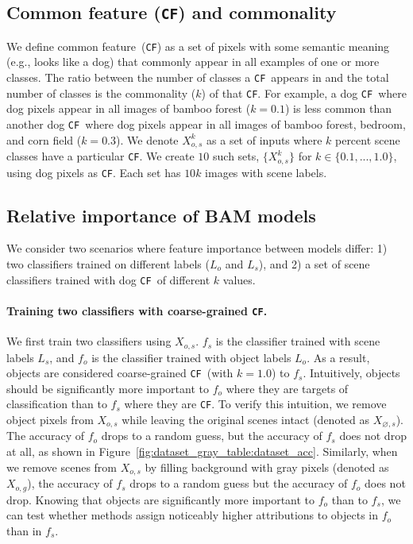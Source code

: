 \documentclass[twoside]{article}
\newcommand{\commonF}{common feature}
\newcommand{\CF}{\texttt{CF}}
\begin{document}
\subsection{Common feature (\CF) and commonality}
We define \commonF~(\CF) as a set of pixels with some semantic meaning (e.g., looks like a dog) that commonly appear in all examples of one or more classes. The ratio between the number of classes a \CF~appears in and the total number of classes is the commonality ($k$) of that \CF. For example, a dog \CF~where dog pixels appear in all images of bamboo forest ($k=0.1$) is less common than another dog \CF~where dog pixels appear in all images of bamboo forest, bedroom, and corn field ($k=0.3$). We denote $X_{o,s}^k$ as a set of inputs where $k$ percent scene classes have a particular \CF. We create $10$ such sets, $\{X_{o, s}^k\}$ for $k \in \{0.1, ..., 1.0\}$, using dog pixels as \CF. Each set has $10k$ images with scene labels.

\subsection{Relative importance of BAM models}
\label{sec:relative_feature_importance_models}
We consider two scenarios where feature importance between models differ: 1) two classifiers trained on different labels ($L_o$ and $L_s$), and 2) a set of scene classifiers trained with dog \CF~of different $k$ values.

\paragraph{Training two classifiers with coarse-grained \CF.}
We first train two classifiers using $X_{o,s}$. $f_s$ is the classifier trained with scene labels $L_s$, and $f_o$ is the classifier trained with object labels $L_o$. As a result, objects are considered coarse-grained \CF~(with $k=1.0$) to $f_s$. Intuitively, objects should be significantly more important to $f_o$ where they are targets of classification than to $f_s$ where they are \CF. To verify this intuition, we remove object pixels from $X_{o,s}$ while leaving the original scenes intact (denoted as $X_{\varnothing,s}$). The accuracy of $f_o$ drops to a random guess, but the accuracy of $f_s$ does not drop at all, as shown in Figure~\ref{fig:dataset_gray_table:dataset_acc}. Similarly, when we remove scenes from $X_{o,s}$ by filling background with gray pixels (denoted as ${X_{o,g}}$), the accuracy of $f_s$ drops to a random guess but the accuracy of $f_o$ does not drop. Knowing that objects are significantly more important to $f_o$ than to $f_s$, we can test whether methods assign noticeably higher attributions to objects in $f_o$ than in $f_s$.
\end{document}
